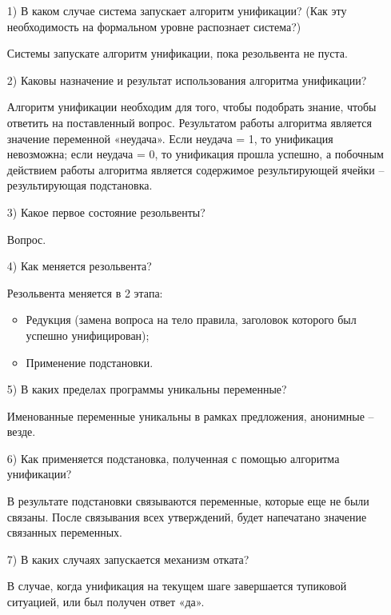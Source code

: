 \documentclass[12pt, a4paper]{extarticle}
\begin{document}
\begin{enumerate} 
	
	\item[1)] В каком случае система запускает алгоритм унификации? (Как эту необходимость на формальном уровне распознает система?)
	
	Системы запускате алгоритм унификации, пока резольвента не пуста.
	
	\item[2)] Каковы назначение и результат использования алгоритма унификации? 
	
	Алгоритм унификации необходим для того, чтобы подобрать знание, чтобы
	ответить на поставленный вопрос. Результатом работы алгоритма является
	значение переменной «неудача». Если неудача = 1, то унификация невозможна;
	если неудача = 0, то унификация прошла успешно, а побочным действием работы
	алгоритма является содержимое результирующей ячейки – результирующая
	подстановка.
	
	\item[3)] Какое первое состояние резольвенты?
	
	Вопрос. 
	
	\item[4)] Как меняется резольвента?
	
	Резольвента меняется в 2 этапа:
	\begin{itemize}
		\item Редукция (замена вопроса на тело правила, заголовок которого был успешно унифицирован);
		\item Применение подстановки.
	\end{itemize}
	
	\item[5)] В каких пределах программы уникальны переменные? 
	
	Именованные переменные уникальны в рамках предложения, анонимные --  везде.
		
	\item[6)] Как применяется подстановка, полученная с помощью алгоритма унификации?
	
	В результате подстановки связываются переменные, которые еще не были
	связаны. После связывания всех утверждений, будет напечатано значение
	связанных переменных.
	
	\item[7)] В каких случаях запускается механизм отката?
	
	В случае, когда унификация на текущем шаге завершается тупиковой
	ситуацией, или был получен ответ «да».	
\end{enumerate}
\end{document}
